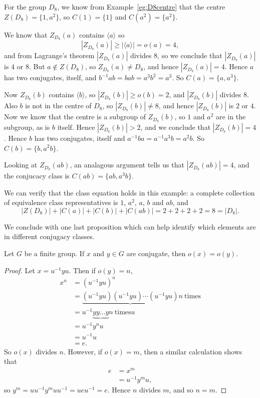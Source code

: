\begin{example}
  For the group $D_{8}$, we know from Example~\ref{eg:D8centre} that
  the centre $Z(D_{8}) = \{1, a^{2}\}$, so $C(1) = \{1\}$ and 
  $C(a^{2}) = \{a^{2}\}$.
  
  We know that $Z_{D_{8}}(a)$ contains $\langle a \rangle$ so 
  \[
    |Z_{D_{8}}(a)| \ge  |\langle a \rangle| = o(a) = 4,
  \]
  and from Lagrange's theorem $|Z_{D_{8}}(a)|$ divides $8$, so we 
  conclude that $|Z_{D_{8}}(a)|$ is $4$ or $8$.  But $a \not\in Z(D_{8})$, 
  so $Z_{D_{8}}(a) \ne D_{8}$, and hence $|Z_{D_{8}}(a)| = 4$.  Hence 
  $a$ has two conjugates, itself, and $b^{-1}ab = bab = a^{3}b^{2} = 
  a^{3}$.  So $C(a) = \{a, a^{3}\}$.
  
  Now $Z_{D_{8}}(b)$ contains $\langle b \rangle$, so $|Z_{D_{8}}(b)|
  \ge o(b) = 2$, and $|Z_{D_{8}}(b)|$ divides $8$.  Also $b$ is not in
  the centre of $D_{8}$, so $|Z_{D_{8}}(b)| \ne 8$, and hence
  $|Z_{D_{8}}(b)|$ is $2$ or $4$.  Now we know that the centre is a 
  subgroup of $Z_{D_{8}}(b)$, so $1$ and $a^{2}$ are in the subgroup, 
  as is $b$ itself.  Hence $|Z_{D_{8}}(b)| > 2$, and we conclude 
  that $|Z_{D_{8}}(b)| = 4$.  Hence $b$ has two conjugates, itself 
  and $a^{-1}ba = a^{-1}a^{3}b = a^{2}b$.  So $C(b) = \{b, a^{2}b\}$.
  
  Looking at $Z_{D_{8}}(ab)$, an analagous argument tells us that 
  $|Z_{D_{8}}(ab)| = 4$, and the conjucacy class is $C(ab) = \{ab, 
  a^{3}b\}$.
  
  We can verify that the class equation holds in this example: a 
  complete collection of equivalence class representatives is $1$, 
  $a^{2}$, $a$, $b$ and $ab$, and
  \[
    |Z(D_{8})| + |C(a)| + |C(b)| + |C(ab)| = 2 + 2 + 2 + 2 = 8 = 
    |D_{8}|.
  \]
\end{example}

We conclude with one last proposition which can help identify which 
elements are in different conjugacy classes.

\begin{proposition}
  Let $G$ be a finite group.  If $x$ and $y \in G$ are conjugate, 
  then $o(x) = o(y)$.
\end{proposition}
\begin{proof}
  Let $x = u^{-1}yu$.  Then if $o(y) = n$,
  \begin{align*}
    x^{n} &= (u^{-1}yu)^{n} \\
          &= \underbrace{(u^{-1}yu)(u^{-1}yu)\cdots 
          (u^{-1}yu)}{n~\text{times}} \\
          &= u^{-1}\underbrace{yy\ldots y}{n~\text{times}}u \\
&= u^{-1}y^{n}u \\
&= u^{-1}u \\
&= e.
  \end{align*}
  So $o(x)$ divides $n$.  However, if $o(x) = m$, then a similar 
  calculation shows that
  \begin{align*}
    e &= x^{m} \\
      &= u^{-1}y^{m}u,
  \end{align*}
  so $y^{m} = uu^{-1}y^{m}uu^{-1} = ueu^{-1} = e$.  Hence $n$ 
  divides $m$, and so $n = m$.
\end{proof}

